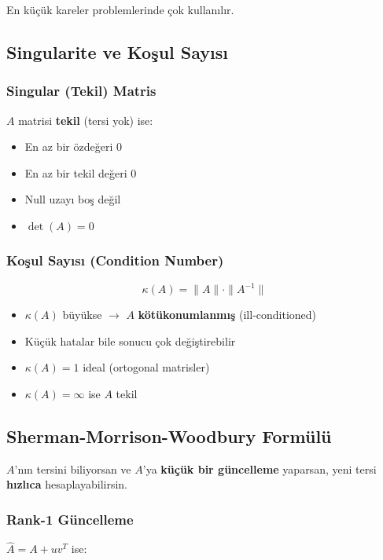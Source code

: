 \documentclass[12pt,a4paper]{article}
\theoremstyle{definition}
\theoremstyle{remark}
\begin{document}
En k\"u\c{c}\"uk kareler problemlerinde \c{c}ok kullan{\i}l{\i}r.

\subsection{Singularite ve Ko\c{s}ul Say{\i}s{\i}}

\subsubsection{Singular (Tekil) Matris}
$A$ matrisi \textbf{tekil} (tersi yok) ise:
\begin{itemize}
    \item En az bir \"ozde\u{g}eri 0
    \item En az bir tekil de\u{g}eri 0
    \item Null uzay{\i} bo\c{s} de\u{g}il
    \item $\det(A) = 0$
\end{itemize}

\subsubsection{Ko\c{s}ul Say{\i}s{\i} (Condition Number)}

\[
\kappa(A) = \|A\| \cdot \|A^{-1}\|
\]

\begin{itemize}
    \item $\kappa(A)$ b\"uy\"ukse $\to$ $A$ \textbf{k\"ot\"ukonumlanm{\i}\c{s}} (ill-conditioned)
    \item K\"u\c{c}\"uk hatalar bile sonucu \c{c}ok de\u{g}i\c{s}tirebilir
    \item $\kappa(A) = 1$ ideal (ortogonal matrisler)
    \item $\kappa(A) = \infty$ ise $A$ tekil
\end{itemize}

\subsection{Sherman-Morrison-Woodbury Form\"ul\"u}

$A$'n{\i}n tersini biliyorsan ve $A$'ya \textbf{k\"u\c{c}\"uk bir g\"uncelleme} yaparsan, yeni tersi \textbf{h{\i}zl{\i}ca} hesaplayabilirsin.

\subsubsection{Rank-1 G\"uncelleme}
$\hat{A} = A + uv^T$ ise:
\end{document}
